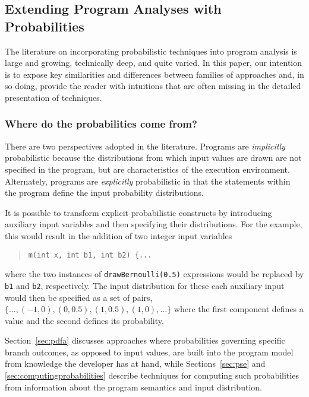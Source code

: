 \subsection{Extending Program Analyses with Probabilities}
\label{sec:overview}

The literature on incorporating probabilistic techniques into 
program analysis is large and growing, technically deep, and quite
varied.  In this paper, our
intention is to expose key similarities and differences between 
families of approaches and, in so doing, provide the reader with
intuitions that are often missing in the detailed presentation of techniques.

\subsubsection{Where do the probabilities come from?}
There are two perspectives adopted in the literature.
Programs are \textit{implicitly} probabilistic because the distributions
from which input values are drawn are not specified in the program,
but are characteristics of the execution environment.
Alternately, programs are \textit{explicitly} probabilistic in 
that the statements
within the program define the input probability distributions.

It is possible to transform explicit probabilistic constructs
by introducing auxiliary input variables and then specifying
their distributions.   For the example, this would result
in the addition of two integer input variables 
\begin{quote}
\texttt{m(int x, int b1, int b2) \{...} 
\end{quote}
where the two instances of
\texttt{drawBernoulli(0.5)} expressions would be replaced
by \texttt{b1} and \texttt{b2}, respectively.  The input
distribution for these each auxiliary input would then be specified
as a set of pairs,
$\{ \ldots, (-1,0), (0,0.5), (1,0.5), (1,0), \ldots \}$
where the first component defines a value and the second defines
its probability.

Section~\ref{sec:pdfa} discusses approaches where probabilities
governing specific branch outcomes, as opposed to input values,
are built into the program model from knowledge the developer
has at hand, while Sections~\ref{sec:pse} and \ref{sec:computingprobabilities}
describe techniques for computing such probabilities from information about
the program semantics and input distribution.

